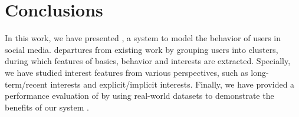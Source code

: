 \section{Conclusions}
\label{sec:conclu}

In this work, we have presented \sys{}, a system to model the \retg{} behavior of users in social media.
\sys{} departures from existing work by grouping users into clusters, during which features of basics, behavior and interests are extracted.
Specially, we have studied interest features from various perspectives, such as long-term/recent interests and explicit/implicit interests.
Finally, we have provided a performance evaluation of \sys{} by using real-world datasets to demonstrate the benefits of our system \sys{}.

